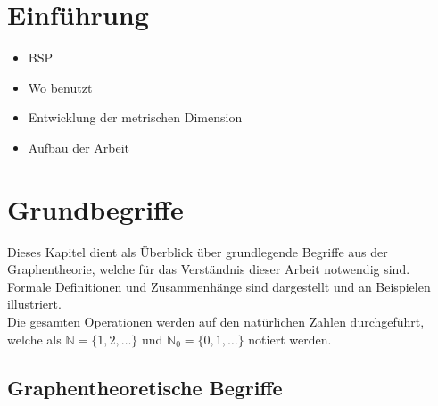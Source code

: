 




\chapter{Einführung}
\begin{itemize}
\item BSP
\item Wo benutzt
\item Entwicklung der metrischen Dimension
\item Aufbau der Arbeit
\end{itemize}
\chapter{Grundbegriffe}
Dieses Kapitel dient als Überblick über grundlegende Begriffe aus der Graphentheorie, welche für das Verständnis dieser Arbeit notwendig sind. Formale Definitionen und Zusammenhänge sind dargestellt und an Beispielen illustriert.\\ %
Die gesamten Operationen werden auf den natürlichen Zahlen durchgeführt, welche als $\mathbb{N}=\{1,2,\ldots\}$ und $\mathbb{N}_0=\{0,1,\ldots\}$ notiert werden.
\section{Graphentheoretische Begriffe}
\label{chap_prel}
